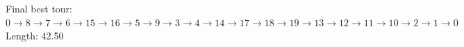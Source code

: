 \noindent\colorbox{gray!15}{\parbox{\dimexpr\linewidth-2\fboxsep}{
Final best tour:\\
$0 \to 8 \to 7 \to 6 \to 15 \to 16 \to 5 \to 9 \to 3 \to 4 \to 14 \to 17 \to 18 \to 19 \to 13 \to 12 \to 11 \to 10 \to 2 \to 1 \to 0$\\
Length: 42.50
}}
